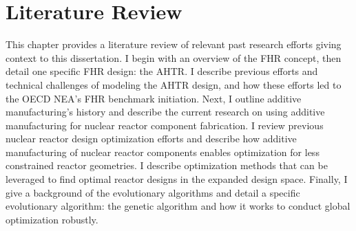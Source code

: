 \chapter{Literature Review}
\label{chap:lit-review}

This chapter provides a literature review of relevant past research efforts 
giving context to this dissertation. 
I begin with an overview of the \gls{FHR} concept, then detail one specific 
\gls{FHR} design: the \gls{AHTR}. 
I describe previous efforts and technical challenges of modeling the \gls{AHTR} design, 
and how these efforts led to the \gls{OECD} \gls{NEA}'s \gls{FHR} benchmark initiation.
Next, I outline additive manufacturing's history and describe the current 
research on using additive manufacturing for nuclear reactor component fabrication. 
I review previous nuclear reactor design optimization efforts and describe how 
additive manufacturing of nuclear reactor components enables optimization for 
less constrained reactor geometries. 
I describe optimization methods that can be leveraged to find optimal reactor 
designs in the expanded design space.
Finally, I give a background of the evolutionary algorithms and detail a specific 
evolutionary algorithm: the genetic algorithm and how it works to conduct global 
optimization robustly.

